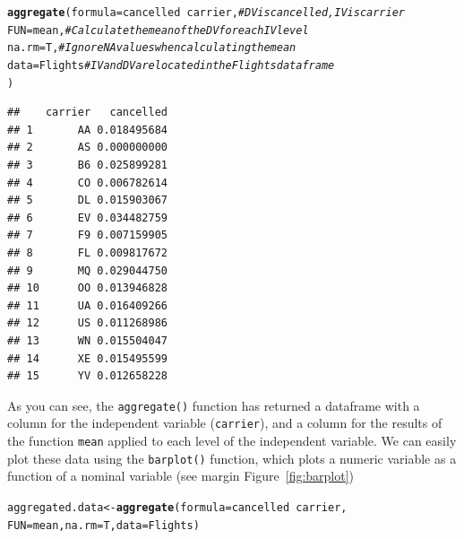 \documentclass{tufte-book}\usepackage[]{graphicx}\usepackage[]{color}
\makeatletter
\newcommand{\hlcom}[1]{\textcolor[rgb]{0.678,0.584,0.686}{\textit{#1}}}%
\newcommand{\hlopt}[1]{\textcolor[rgb]{0,0,0}{#1}}%
\newcommand{\hlstd}[1]{\textcolor[rgb]{0.345,0.345,0.345}{#1}}%
\newcommand{\hlkwb}[1]{\textcolor[rgb]{0.69,0.353,0.396}{#1}}%
\newcommand{\hlkwc}[1]{\textcolor[rgb]{0.333,0.667,0.333}{#1}}%
\newcommand{\hlkwd}[1]{\textcolor[rgb]{0.737,0.353,0.396}{\textbf{#1}}}%
\newenvironment{kframe}{%
 \def\at@end@of@kframe{}%
 \ifinner\ifhmode%
  \def\at@end@of@kframe{\end{minipage}}%
  \begin{minipage}{\columnwidth}%
 \fi\fi%
 \def\FrameCommand##1{\hskip\@totalleftmargin \hskip-\fboxsep
 \colorbox{shadecolor}{##1}\hskip-\fboxsep
     \hskip-\linewidth \hskip-\@totalleftmargin \hskip\columnwidth}%
 \MakeFramed {\advance\hsize-\width
   \@totalleftmargin\z@ \linewidth\hsize
   \@setminipage}}%
 {\par\unskip\endMakeFramed%
 \at@end@of@kframe}
\newenvironment{knitrout}{}{} %
\makeatother
\begin{document}
\begin{footnotesize}
\begin{footnotesize}
\begin{knitrout}
\color{fgcolor}\begin{kframe}
\begin{alltt}
\hlkwd{aggregate}\hlstd{(}\hlkwc{formula} \hlstd{= cancelled} \hlopt{~} \hlstd{carrier,}  \hlcom{# DV is cancelled, IV is carrier}
          \hlkwc{FUN} \hlstd{= mean,} \hlcom{# Calculate the mean of the DV for each IV level}
          \hlkwc{na.rm} \hlstd{= T,} \hlcom{# Ignore NA values when calculating the mean}
          \hlkwc{data} \hlstd{= Flights} \hlcom{# IV and DV are located in the Flights dataframe}
          \hlstd{)}
\end{alltt}
\begin{verbatim}
##    carrier   cancelled
## 1       AA 0.018495684
## 2       AS 0.000000000
## 3       B6 0.025899281
## 4       CO 0.006782614
## 5       DL 0.015903067
## 6       EV 0.034482759
## 7       F9 0.007159905
## 8       FL 0.009817672
## 9       MQ 0.029044750
## 10      OO 0.013946828
## 11      UA 0.016409266
## 12      US 0.011268986
## 13      WN 0.015504047
## 14      XE 0.015495599
## 15      YV 0.012658228
\end{verbatim}
\end{kframe}
\end{knitrout}
\end{footnotesize}


As you can see, the \texttt{aggregate()} function has returned a dataframe with a column for the independent variable (\texttt{carrier}), and a column for the results of the function \texttt{mean} applied to each level of the independent variable. We can easily plot these data using the \texttt{barplot()} function, which plots a numeric variable as a function of a nominal variable (see margin Figure~\ref{fig:barplot})

\begin{marginfigure}
\begin{tiny}
\begin{knitrout}
\color{fgcolor}\begin{kframe}
\begin{alltt}
\hlstd{aggregated.data} \hlkwb{<-} \hlkwd{aggregate}\hlstd{(}\hlkwc{formula} \hlstd{= cancelled} \hlopt{~} \hlstd{carrier,}
                             \hlkwc{FUN} \hlstd{= mean,} \hlkwc{na.rm} \hlstd{= T,} \hlkwc{data} \hlstd{= Flights)}


\end{alltt}
\end{kframe}
\end{knitrout}
\end{tiny}
\end{marginfigure}
\end{footnotesize}
\end{document}

